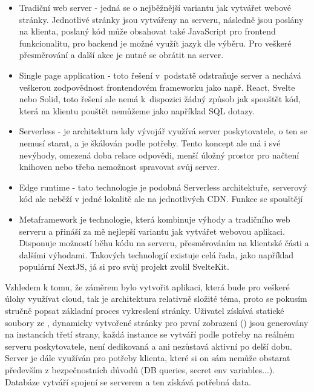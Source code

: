 \documentclass[12pt, a4paper,
openright
]{report}
\begin{document}
\begin{itemize}
\item Tradiční web server - jedná se o nejběžnější variantu jak vytvářet webové stránky. Jednotlivé stránky jsou vytvářeny na serveru, následně jsou poslány na klienta, poslaný kód může obsahovat také JavaScript pro frontend funkcionalitu, pro backend je možné využít jazyk dle výběru. Pro veškeré přesměrování a další akce je nutné se obrátit na server.

\item Single page application - toto řešení v~podstatě odstraňuje server a nechává veškerou zodpovědnost frontendovém frameworku jako např. React, Svelte nebo Solid, toto řešení ale nemá k~dispozici žádný způsob jak spouštět kód, která na klientu pouštět nemůžeme jako například SQL dotazy.

\item Serverless - je architektura kdy vývojář využívá server poskytovatele, o ten se nemusí starat, a je škálován podle potřeby. Tento koncept ale má i své nevýhody, omezená doba relace odpovědi, menší úložný prostor pro načtení knihoven nebo třeba nemožnost spravovat svůj server.

\item Edge runtime - tato technologie je podobná Serverless architektuře, serverový kód ale neběží v jedné lokalitě ale na jednotlivých CDN. Funkce se spouštějí

\item Metaframework je technologie, která kombinuje výhody  a tradičního web serveru a přináší za mě nejlepší variantu jak vytvářet webovou aplikaci. Disponuje možností běhu kódu na serveru, přesměrováním na klientské části a dalšími výhodami. Takových technologií existuje celá řada, jako například populární NextJS, já si pro svůj projekt zvolil SvelteKit.
\end{itemize}

Vzhledem k tomu, že záměrem bylo vytvořit aplikaci, která bude pro veškeré  úlohy využívat cloud, tak je architektura relativně složité téma, proto se pokusím stručně popsat základní proces vykreslení stránky. Uživatel získává statické soubory ze , dynamicky vytvořené stránky pro první zobrazení () jsou generovány na instancích  třetí strany, každá instance se vytváří podle potřeby na reálném serveru poskytovatele, není dedikovaná a ani nezůstavá aktivní po delší dobu. Server je dále využíván pro potřeby klienta, které si on sám nemůže obstarat především z bezpečnostních důvodů (DB queries, secret env variables...). Databáze vytváří spojení se serverem a ten získává potřebná data.
\end{document}
